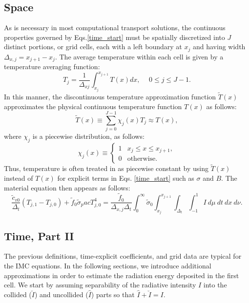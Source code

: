 \subsection{Space}
As is necessary in most computational transport solutions, the continuous
properties governed by Eqs.\hspace{3pt}\eqref{time_start} must be spatially
discretized
into $J$ distinct
portions, or grid cells, each with a left boundary at $x_j$ and having width
$\Delta_{x,j}=x_{j+1}-x_j$.  The average temperature within each cell is given
by a
temperature averaging function:
\[T_j=\frac{1}{\Delta_{xj}}\int_{x_j}^{x_{j+1}}T(x)dx, \hspace{15pt}
  0\leq j\leq J-1. \]
In this manner, the discontinuous temperature approximation function $\tilde
T(x)$ approximates the physical continuous temperature function $T(x)$ as
follows:
\[\tilde T(x)\equiv\sum_{j=0}^{J-1}\chi_j(x)T_j\approx T(x),\]
where $\chi_j$ is a piecewise distribution, as follows:
\begin{equation}
\chi_j(x)\equiv
\begin{cases}
1 & x_j\leq x\leq x_{j+1}, \\
0 & \mbox{otherwise}.
\end{cases}
\end{equation}
Thus, temperature is often treated in as piecewise constant by
using $\tilde T(x)$ instead of $T(x)$ for explicit terms in Eqs.
\eqref{time_start} such as $\sigma$ and $B$.  The material equation then
appears as follows:
\begin{equation}
\frac{\tilde c_{v0}}{\Delta_t}(T_{j,1}-T_{j,0}) + 
  \tilde f_0 \tilde \sigma_p acT^4_{j,0} = 
  \frac{\tilde f_0}{\Delta_{x,j}
  \Delta_t}\int_0^\infty\tilde\sigma_0\int_{x_j}^{x_{j+1}}
\int_{\Delta_t}\int_{-1}^1 I \ d\mu \ dt\  dx\  d\nu.
\end{equation}

\subsection{Time, Part II}
The previous definitions, time-explicit coefficients, and grid data are typical
for the IMC equations.  In the following sections, we introduce additional
approximations in order to estimate the radiation energy deposited in the first
cell.
We start by assuming separability of the radiative
intensity $I$ into the collided ($\breve I$) and uncollided ($\hat I$)
parts so that $\hat I + \breve I=I$.

